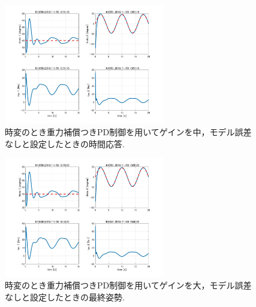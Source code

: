\documentclass[twocolumn, 10pt,a4j]{jsarticle}
\begin{document}
    \begin{figure}[H]
      \begin{center}
        \includegraphics[width=7cm]{../img/img/kansetu_juryoku_hosyo_PD_zihen_chu_no_model_gosa_zikan_auto.jpg}
        \caption{時変のとき重力補償つきPD制御を用いてゲインを中，モデル誤差なしと設定したときの時間応答.}
      \end{center}
    \end{figure}
    \begin{figure}[H]
      \begin{center}
        \includegraphics[width=7cm]{../img/img/kansetu_juryoku_hosyo_PD_zihen_large_no_model_gosa_saisyu_sisei.jpg}
        \caption{時変のとき重力補償つきPD制御を用いてゲインを大，モデル誤差なしと設定したときの最終姿勢.}
      \end{center}
    \end{figure}
\end{document}
